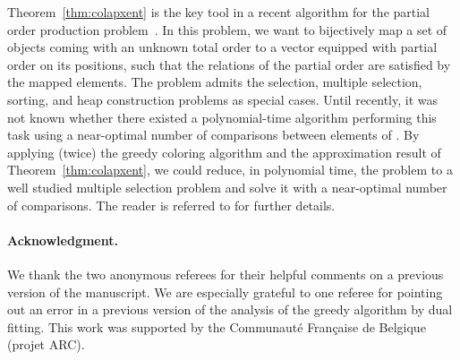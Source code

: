 \documentclass[10pt,a4paper]{article}
\begin{document}
Theorem~\ref{thm:colapxent} is the key tool in a recent algorithm for the partial order production problem~\cite{POP_SICOMP}. In this problem, we want to bijectively map a set  of objects coming with an unknown total order to a vector equipped with partial order on its positions, such that the relations of the partial order are satisfied by the mapped elements. The problem admits the selection, multiple selection, sorting, and heap construction problems as special cases. Until recently, it was not known whether there existed a polynomial-time algorithm performing this task using a near-optimal number of comparisons between elements of . By applying (twice) the greedy coloring algorithm and the approximation result of Theorem~\ref{thm:colapxent}, we could reduce, in polynomial time, the problem to a well studied multiple selection problem and solve it with a near-optimal number of comparisons. The reader is referred to \cite{POP_SICOMP} for further details.

\paragraph{Acknowledgment.}
We thank the two anonymous referees for their helpful comments on a previous version of the manuscript.
We are especially grateful to one referee for pointing out an error in a previous
version of the analysis of the greedy algorithm by dual fitting.
This work was supported by the Communaut\'e Fran\c caise de Belgique (projet ARC).



\end{document}
